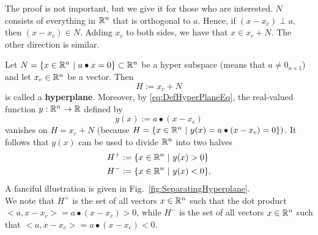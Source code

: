 The proof is not important, but we give it for those who are interested. $N$ consists of everything in $\mathbb R^n$ that is orthogonal to $a$. Hence, if $(x-x_c) \perp a$, then $(x-x_c) \in N$. Adding $x_c$ to both sides, we have that $x \in x_c + N$. The other direction is similar. \Qed

    \vspace*{0.2cm}

\begin{tcolorbox}[title=\textbf{Hyperplanes are Translations of Hyper Subspaces}]
Let $N = \{ x\in \mathbb R^n~|~ a \bullet x = 0\} \subset \mathbb R^n$ be a hyper subspace (means that $a \neq 0_{n \times 1}$) and let $x_c\in \mathbb R^n$ be a vector. Then 
\begin{equation}
    \label{eq:DefHyperPlane}
    H:=x_c + N 
\end{equation}
is called a \textbf{hyperplane}. Moreover, by \eqref{eq:DefHyperPlaneEq}, the real-valued function $y:\mathbb R^n \to \mathbb R$ defined by
\begin{equation}
    \label{eq:DefHyperPlaneFunction}
    y(x):=a \bullet(x-x_c)
\end{equation}
vanishes on $H=x_c + N$ (because $ H =\{x\in \mathbb R^n~|~y(x)= a\bullet(x-x_c) =0\})$. It follows that $y(x)$ can be used to divide $\mathbb R^n$ into two halves
\begin{equation}
    \label{eq:halfSpaces}
    \begin{aligned}
        H^+&:= \{ x\in \mathbb R^n~|~ y(x) > 0\} \\
        H^-&:= \{ x\in \mathbb R^n~|~ y(x) < 0\}.
    \end{aligned}
\end{equation}
A fanciful illustration is given in Fig.~\ref{fig:SeparatingHyperplane}.\\

We note that $H^+$ is the set of all vectors $x\in \mathbb R^n$ such that the dot product $ <a,  x-x_c > = a \bullet (x-x_c) >0$, while $H^-$ is the set of all vectors $x\in \mathbb R^n$ such that $<a,  x-x_c > = a \bullet (x-x_c) <0$. 
\end{tcolorbox}
 
  \vspace*{0.2cm}
  
